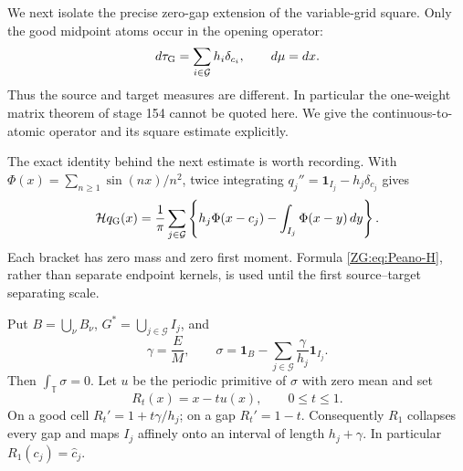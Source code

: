 \documentclass[11pt]{amsart}
\numberwithin{equation}{section}
\theoremstyle{definition}
\theoremstyle{remark}
\newcommand{\T}{\mathbb T}
\newcommand{\Hil}{\mathcal H}
\begin{document}
We next isolate the precise zero-gap extension of the variable-grid
square.  Only the good midpoint atoms occur in the opening operator:
\begin{equation}\label{ZG:eq:tau}
 d\tau_{\rm G}=\sum_{i\in\mathcal G}h_i\delta_{c_i},
 \qquad d\mu=dx.
\end{equation}
Thus the source and target measures are different.  In particular the
one-weight matrix theorem of stage 154 cannot be quoted here.  We give
the continuous-to-atomic operator and its square estimate explicitly.

The exact identity behind the next estimate is worth recording.  With
$\Phi(x)=\sum_{n\ge1}\sin(nx)/n^2$, twice integrating
$q_j''=\mathbf1_{I_j}-h_j\delta_{c_j}$ gives
\begin{equation}\label{ZG:eq:Peano-H}
 \Hil q_{\rm G}(x)=\frac1\pi\sum_{j\in\mathcal G}
 \left\{h_j\Phi(x-c_j)-\int_{I_j}\Phi(x-y)\,dy\right\}.
\end{equation}
Each bracket has zero mass and zero first moment.  Formula
\eqref{ZG:eq:Peano-H}, rather than separate endpoint kernels, is used until
the first source--target separating scale.

Put $B=\bigcup_\nu B_\nu$, $G^*=\bigcup_{j\in\mathcal G}I_j$, and
\begin{equation}\label{ZG:eq:sigma}
 \gamma=\frac EM,
 \qquad
 \sigma=\mathbf1_B-
 \sum_{j\in\mathcal G}\frac{\gamma}{h_j}\mathbf1_{I_j}.
\end{equation}
Then $\int_\T\sigma=0$.  Let $u$ be the periodic primitive of $\sigma$
with zero mean and set
\begin{equation}\label{ZG:eq:collapse-map}
 R_t(x)=x-tu(x),\qquad 0\le t\le1.
\end{equation}
On a good cell $R_t'=1+t\gamma/h_j$; on a gap $R_t'=1-t$.
Consequently $R_1$ collapses every gap and maps $I_j$ affinely onto an
interval of length $h_j+\gamma$.  In particular
$R_1(c_j)=\widehat c_j$.
\end{document}
